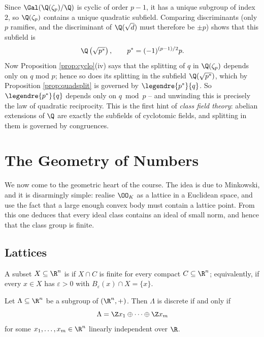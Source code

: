 \begin{remark}
	Since $\Gal(\Q(\zeta_p)/\Q)$ is cyclic of order $p-1$, it has a unique subgroup of index $2$, so $\Q(\zeta_p)$ contains a unique quadratic subfield. Comparing discriminants (only $p$ ramifies, and the discriminant of $\Q(\sqrt d)$ must therefore be $\pm p$) shows that this subfield is
	$$\Q\left(\sqrt{p^*}\right), \qquad p^* = (-1)^{(p-1)/2}p.$$
	Now Proposition \ref{prop:cyclo}(iv) says that the splitting of $q$ in $\Q(\zeta_p)$ depends only on $q$ mod $p$; hence so does its splitting in the subfield $\Q(\sqrt{p^*})$, which by Proposition \ref{prop:quadsplit} is governed by $\legendre{p^*}{q}$. So $\legendre{p^*}{q}$ depends only on $q \bmod p$ -- and unwinding this is precisely the law of quadratic reciprocity. This is the first hint of \emph{class field theory}: abelian extensions of $\Q$ are exactly the subfields of cyclotomic fields, and splitting in them is governed by congruences.
\end{remark}

\section{The Geometry of Numbers}\label{sec:geom}

We now come to the geometric heart of the course. The idea is due to Minkowski, and it is disarmingly simple: realise $\OO_K$ as a lattice in a Euclidean space, and use the fact that a large enough convex body must contain a lattice point. From this one deduces that every ideal class contains an ideal of small norm, and hence that the class group is finite.

\subsection{Lattices}

\begin{definition}[Discrete]
	A subset $X \subseteq \R^n$ is  if $X \cap C$ is finite for every compact $C \subseteq \R^n$; equivalently, if every $x \in X$ has $\varepsilon > 0$ with $B_\varepsilon(x)\cap X = \{x\}$.
\end{definition}

\begin{proposition}\label{prop:discrete}
	Let $\Lambda \subseteq \R^n$ be a subgroup of $(\R^n,+)$. Then $\Lambda$ is discrete if and only if
	$$\Lambda = \Z x_1 \oplus \dots \oplus \Z x_m$$
	for some $x_1,\dots,x_m \in \R^n$ linearly independent over $\R$.
\end{proposition}

